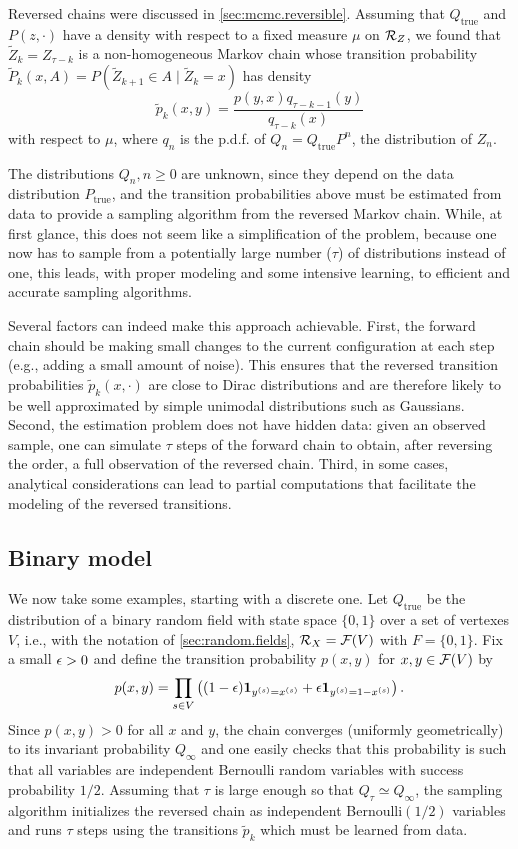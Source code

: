 Reversed chains were discussed in \cref{sec:mcmc.reversible}. Assuming that $Q_{\mathrm{true}}$ and $P(z, \cdot)$ have a density with respect to a fixed measure $\mu$ on ${\mathcal R}_Z$,  we found that $\tilde Z_k = Z_{\tau-k}$ is a non-homogeneous Markov chain whose transition probability $\tilde P_k(x, A) = P(\tilde Z_{k+1} \in A\mid \tilde Z_k = x)$ has density
\[
\tilde p_k(x,y) =  \frac{p(y,x)q_{\tau-k-1}(y)}{q_{\tau-k}(x)}
\]
with respect to $\mu$, where $q_n$ is the p.d.f. of $Q_n = Q_{\mathrm{true}} P^n$, the distribution of $Z_n$.

The distributions $Q_n, n\geq 0$ are unknown, since they depend on the data distribution $P_{\mathrm{true}}$, and the transition probabilities above must be estimated from data to provide a sampling algorithm from the reversed Markov chain. While, at first glance, this does not seem like a simplification of the problem, because one now has to sample from a potentially large number ($\tau$) of distributions instead of one, this leads, with proper modeling and some intensive learning, to efficient and accurate sampling algorithms.

Several factors can indeed make this approach achievable. First, the forward chain should be making small changes to the current configuration at each step (e.g., adding a small amount of noise). This ensures that the reversed transition probabilities $\tilde p_k(x, \cdot)$ are close to Dirac distributions and are therefore likely to be well approximated by simple unimodal distributions such as Gaussians. Second, the estimation problem does not have hidden data: given an observed sample, one can simulate $\tau$ steps of the forward chain to obtain, after reversing the order, a full observation of the reversed chain. Third, in some cases, analytical considerations can lead to partial computations that facilitate the modeling of the reversed transitions.

\subsection{Binary model}
We now take some examples, starting with a discrete one. Let $Q_{\mathrm{true}}$ be the distribution of a binary random field with state space $\{0, 1\}$ over a set of vertexes $V$, i.e., with the notation of \cref{sec:random.fields}, ${\mathcal R}_X = {\mathcal F}(V)$ with $F = \{0,1\}$. Fix a small $\epsilon>0$ and define the transition probability $p(x,y)$ for $x,y \in {\mathcal F}(V)$ by
\[
p(x,y) = \prod_{s\in V} \left((1-\epsilon) {\bm 1}_{y^{(s)} = x^{(s)}} + \epsilon{\bm1}_{y^{(s)} = 1 - x^{(s)}}\right).
\]
Since $p(x,y) >0$ for all $x$ and $y$, the chain converges (uniformly geometrically) to its invariant probability $Q_\infty$ and one easily checks that this probability is such that all variables are independent Bernoulli random variables with success probability $1/2$. Assuming that $\tau$ is large enough so that $Q_\tau \simeq Q_\infty$, the sampling algorithm initializes the reversed chain as independent Bernoulli$(1/2)$ variables and runs $\tau$ steps using the transitions $\tilde p_k$ which must be learned from data. 

